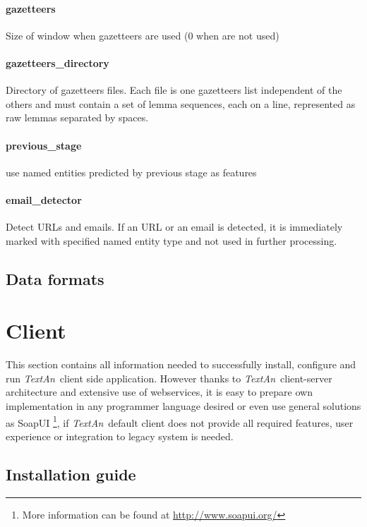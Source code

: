\documentclass[12pt,a4paper]{report}
\newcommand{\textan}{\emph{TextAn}}
\begin{document}
\paragraph{gazetteers}
Size of window when gazetteers are used (0 when are not used)

\paragraph{gazetteers\_directory}
Directory of gazetteers files. Each file is one gazetteers list independent of the others and must contain a set of lemma sequences, each on a line, represented as raw lemmas separated by spaces.

\paragraph{previous\_stage}
use named entities predicted by previous stage as features

\paragraph{email\_detector}
Detect URLs and emails. If an URL or an email is detected, it is immediately marked with specified named entity type and not used in further processing.

\subsection{Data formats}

\section{Client}

This section contains all information needed to successfully install, configure and run \textan\ client side application.
However thanks to \textan\ client-server architecture and extensive use of webservices,
it is easy to prepare own implementation in any programmer language desired or even use general solutions as SoapUI
\footnote{More information can be found at \url{http://www.soapui.org/}},
if \textan\ default client does not provide all required features, user experience or integration to legacy system is needed.

\subsection{Installation guide}
\end{document}
